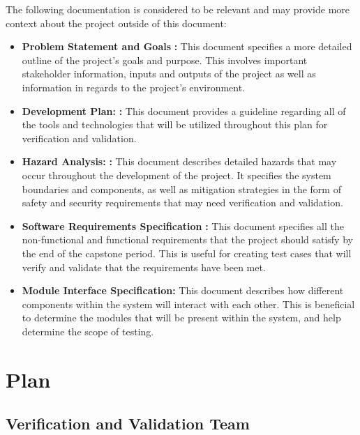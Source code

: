 \documentclass[12pt, titlepage]{article}
\begin{document}
The following documentation is considered to be relevant and may provide more context about the project outside of this document:
\begin{itemize}
  \item \textbf{Problem Statement and Goals} \citep{ProblemStatementGoals}\textbf{:} This document specifies a more detailed outline of the project's goals and purpose. This involves important stakeholder information, inputs and outputs of the project as well as information in regards to the project's environment.
  \item \textbf{Development Plan:} \citep{DevelopmentPlan}\textbf{:} This document provides a guideline regarding all of the tools and technologies that will be utilized throughout this plan for verification and validation.
  \item \textbf{Hazard Analysis:} \citep{HazardAnalysis}\textbf{:} This document describes detailed hazards that may occur throughout the development of the project. It specifies the system boundaries and components, as well as mitigation strategies in the form of safety and security requirements that may need verification and validation.
  \item \textbf{Software Requirements Specification} \citep{SRS}\textbf{:} This document specifies all the non-functional and functional requirements that the project should satisfy by the end of the capstone period. This is useful for creating test cases that will verify and validate that the requirements have been met.
  \item \textbf{Module Interface Specification:} This document describes how different components within the system will interact with each other. This is beneficial to determine the modules that will be present within the system, and help determine the scope of testing.

\end{itemize}


\section{Plan}


\subsection{Verification and Validation Team}
\end{document}
